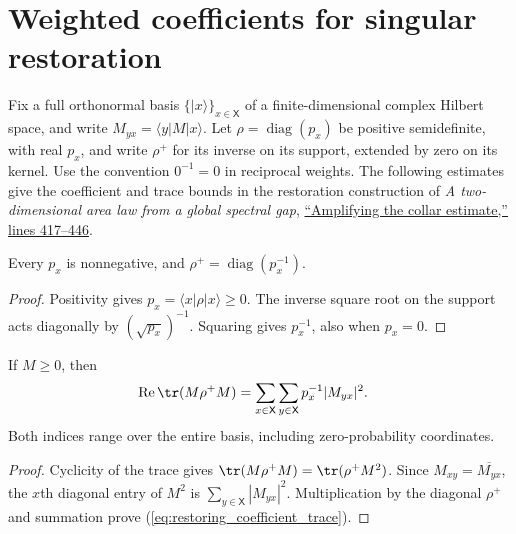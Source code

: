 \section{Weighted coefficients for singular restoration}
\label{sec:restoring_coefficient_bound}

Fix a full orthonormal basis $\{|x\rangle\}_{x\in\mathsf X}$ of a
finite-dimensional complex Hilbert space, and write
$M_{yx}=\langle y|M|x\rangle$.
Let $\rho=\operatorname{diag}(p_x)$ be positive semidefinite, with real
$p_x$, and write $\rho^+$ for its inverse on its support, extended by zero
on its kernel. Use the convention $0^{-1}=0$ in reciprocal weights.
The following estimates give the coefficient and trace bounds in the
restoration construction of \emph{A two-dimensional area law from a
global spectral gap},
\href{https://github.com/openai/math/blob/adc7f1241b42e322a6451854ab7e4b4c146bf78a/preprints/A-two-dimensional-area-law-from-a-global-spectral-gap-September-24-2026/build/sections/09-amplification.tex\#L417-L446}{``Amplifying the collar estimate,'' lines 417--446}.

\begin{theorem}
\label{thm:restoring_diagonal_inverse}
\leanok
Every $p_x$ is nonnegative, and
$\rho^+=\operatorname{diag}(p_x^{-1})$.
\end{theorem}
\begin{proof}
\leanok
Positivity gives $p_x=\langle x|\rho|x\rangle\ge0$.
The inverse square root on the support acts diagonally by
$(\sqrt{p_x})^{-1}$. Squaring gives $p_x^{-1}$, also when $p_x=0$.
\end{proof}

\begin{theorem}
\label{thm:restoring_coefficient_trace}
\leanok
If $M\ge0$, then
\begin{align}
\operatorname{Re}\tr(M\rho^+M)
  &=\sum_{x\in\mathsf X}\sum_{y\in\mathsf X}
      p_x^{-1}|M_{yx}|^2.
\label{eq:restoring_coefficient_trace}
\end{align}
Both indices range over the entire basis, including zero-probability
coordinates.
\end{theorem}
\begin{proof}
\leanok
{}
Cyclicity of the trace gives
$\tr(M\rho^+M)=\tr(\rho^+M^2)$.
Since $M_{xy}=\overline{M_{yx}}$, the $x$th diagonal entry of $M^2$ is
$\sum_{y\in\mathsf X}|M_{yx}|^2$.
Multiplication by the diagonal $\rho^+$ and summation prove
(\ref{eq:restoring_coefficient_trace}).
\end{proof}

